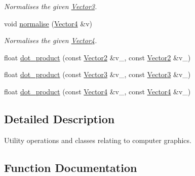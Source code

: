 \begin{DoxyCompactItemize}
\begin{DoxyCompactList}\small\item\em Normalises the given \hyperlink{classchaos_1_1gfx_1_1_vector3}{Vector3}. \end{DoxyCompactList}\item 
\hypertarget{namespacechaos_1_1gfx_ac6a7b42950415c9292e26fa3e3f668cd}{}void \hyperlink{namespacechaos_1_1gfx_ac6a7b42950415c9292e26fa3e3f668cd}{normalise} (\hyperlink{classchaos_1_1gfx_1_1_vector4}{Vector4} \&v)\label{namespacechaos_1_1gfx_ac6a7b42950415c9292e26fa3e3f668cd}

\begin{DoxyCompactList}\small\item\em Normalises the given \hyperlink{classchaos_1_1gfx_1_1_vector4}{Vector4}. \end{DoxyCompactList}\item 
float \hyperlink{namespacechaos_1_1gfx_acd651c7bb94c56e7070ca515a3515666}{dot\+\_\+product} (const \hyperlink{classchaos_1_1gfx_1_1_vector2}{Vector2} \&v\+\_, const \hyperlink{classchaos_1_1gfx_1_1_vector2}{Vector2} \&v\+\_)
\item 
float \hyperlink{namespacechaos_1_1gfx_a83b19bb75ac950fd15409cc8cb788d3b}{dot\+\_\+product} (const \hyperlink{classchaos_1_1gfx_1_1_vector3}{Vector3} \&v\+\_, const \hyperlink{classchaos_1_1gfx_1_1_vector3}{Vector3} \&v\+\_)
\item 
float \hyperlink{namespacechaos_1_1gfx_ae77430b2fa8891e2dfcbac28b85b1aad}{dot\+\_\+product} (const \hyperlink{classchaos_1_1gfx_1_1_vector4}{Vector4} \&v\+\_, const \hyperlink{classchaos_1_1gfx_1_1_vector4}{Vector4} \&v\+\_)
\end{DoxyCompactItemize}


\subsection{Detailed Description}
Utility operations and classes relating to computer graphics. 

\subsection{Function Documentation}
\hypertarget{namespacechaos_1_1gfx_acd651c7bb94c56e7070ca515a3515666}{}
